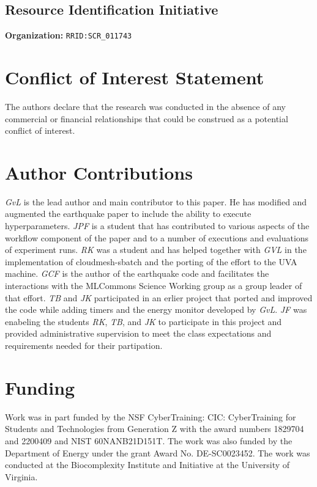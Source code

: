 \documentclass[utf8]{FrontiersinVancouver} %
\begin{document}
\subsection{Resource Identification Initiative}

{\bf Organization:} \verb|RRID:SCR_011743|

\section*{Conflict of Interest Statement}

The authors declare that the research was conducted in the absence of
any commercial or financial relationships that could be construed as a
potential conflict of interest.

\section*{Author Contributions}

{\em GvL} is the lead author and main contributor to this paper. He
has modified and augmented the earthquake paper to include the ability
to execute hyperparameters. {\em JPF} is a student that has
contributed to various aspects of the workflow component of the paper
and to a number of executions and evaluations of experiment runs. {\em
  RK} was a student and has helped together with {\em GVL} in the
implementation of cloudmesh-sbatch and the porting of the effort to
the UVA machine.  {\em GCF} is the author of the earthquake code and
facilitates the interactions with the MLCommons Science Working group
as a group leader of that effort. {\em TB} and {\em JK} participated
in an erlier project that ported and improved the code while adding
timers and the energy monitor developed by {\em GvL}. {\em JF} was
enabeling the students {\em RK}, {\em TB}, and {\em JK} to participate
in this project and provided administrative supervision to meet the
class expectations and requirements needed for their partipation.

\section*{Funding}

Work was in part funded by the NSF CyberTraining: CIC: CyberTraining
for Students and Technologies from Generation Z with the award numbers
1829704 and 2200409 and NIST 60NANB21D151T.  The work was also funded
by the Department of Energy under the grant Award
No. DE-SC0023452. The work was conducted at the Biocomplexity
Institute and Initiative at the University of Virginia.
\end{document}
